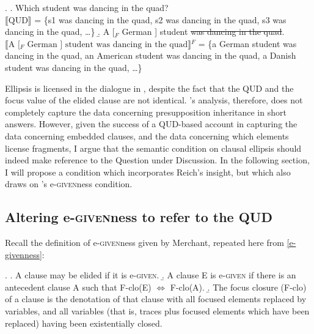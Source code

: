 \documentclass[doublespace]{umthesis}
\newcommand{\ext}[1]{\ensuremath{\llbracket \textrm{{#1}} \rrbracket}}
\begin{document}
\ex. 	\a. Which student was dancing in the quad?\\
		\ext{QUD} = \{s1 was dancing in the quad, s2 was dancing in the quad, s3 was dancing in the quad, \ldots\}
	\b. A [$_{F}$ German ] student \sout{was dancing in the quad}.\\ 
		\ext{A [$_{F}$ German ] student was dancing in the quad}$^F$ = \{a German student was dancing in the quad, an American student was dancing in the quad, a Danish student was dancing in the quad, \ldots\}
		
Ellipsis is licensed in the dialogue in \Last, despite the fact that the QUD and the focus value of the elided clause are not identical. \cite{Re07}'s analysis, therefore, does not completely capture the data concerning presupposition inheritance in short answers. However, given the success of a QUD-based account in capturing the data concerning embedded clauses, and the data concerning which elements license fragments, I argue that the semantic condition on clausal ellipsis should indeed make reference to the Question under Discussion. In the following section, I will propose a condition which incorporates Reich's insight, but which also draws on \cite{Me01, Me04}'s e-\textsc{given}ness condition.



\subsection{Altering e-\textsc{given}ness to refer to the QUD}

Recall the definition of e-\textsc{given}ness given by Merchant, repeated here from \ref{e-givenness}:

\ex. 	\a. A clause may be elided if it is e-\textsc{given}.
	\b. A clause E is e-\textsc{given} if there is an antecedent clause A such that F-clo(E) $\Leftrightarrow$ F-clo(A).
	\b. The focus closure (F-clo) of a clause is the denotation of that clause with all focused elements replaced by variables, and all variables (that is, traces plus focused elements which have been replaced) having been existentially closed.\label{fclosure}
	
\end{document}
